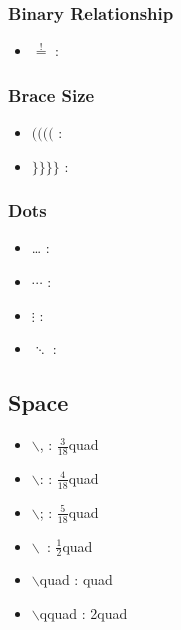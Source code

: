 \documentclass{article}
\begin{document}
\subsubsection{Binary Relationship}
\begin{itemize}
    \item $\stackrel{!}{=}$ : 
\end{itemize}

\subsubsection{Brace Size} 
\begin{itemize}
    \item $\big(\Big(\bigg(\Bigg($ : 
    \item $\big\}\Big\}\bigg\}\Bigg\}$ : 
\end{itemize}

\subsubsection{Dots}
\begin{itemize}
    \item \ldots{} : 
    \item $\cdots$ : 
    \item $\vdots$ : 
    \item $\ddots$ : 
\end{itemize}

\subsection{Space} 
\begin{itemize}
    \item $\backslash$, : $\frac{3}{18}$quad\verb*| |
    \item $\backslash$: : $\frac{4}{18}$quad\verb*| |
    \item $\backslash$; : $\frac{5}{18}$quad\verb*| |
    \item $\backslash$\verb*| |: $\frac{1}{2}$quad\verb*| |
    \item $\backslash$quad : quad\verb*| |
    \item $\backslash$qquad : 2quad\verb*| |
\end{itemize}
\end{document}
